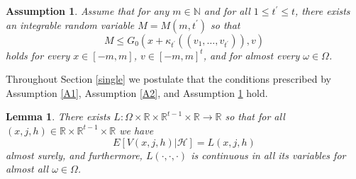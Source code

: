 \documentclass[a4paper]{article}
\newtheorem{lemma}[theorem]{Lemma}
\newtheorem{remark}[theorem]{Remark}
\newtheorem{assumption}[theorem]{Assumption}
\begin{document}

\begin{assumption}\label{A3}
Assume that for any $m \in \mathbb{N}$ and for all $1\leq t^{'} \leq t$, there exists an integrable random variable $M = M(m, t^{'})$ so that
$$M \leq G_0(x + \kappa_{t^{'}}((v_1,\hdots, v_{t^{'}})),v)$$
holds for every $x \in [-m,m]$, $v \in [-m,m]^{t}$, and for almost every $\omega \in \Omega$. 
\end{assumption}






Throughout Section \ref{single} we postulate that the conditions prescribed by Assumption \ref{A1}, Assumption \ref{A2}, and Assumption \ref{A3} hold.

\begin{lemma}\label{continuous_version}
There exists $L : \Omega\times \mathbb{R} \times \mathbb{R}^{t-1} \times \mathbb{R} \to \mathbb{R}$ so that for all $(x,j,h) \in \mathbb{R} \times \mathbb{R}^{t-1} \times \mathbb{R}$ we have 
$$ E[V(x,j,h) | \mathcal{H}] = L(x,j,h)$$
almost surely, and furthermore, $L(\cdot,\cdot,\cdot)$  is continuous in all its variables for almost all $\omega \in \Omega$.
\end{lemma}
 
\end{document}
